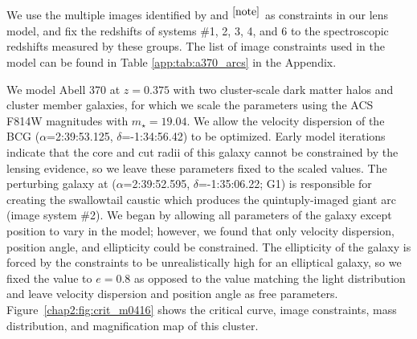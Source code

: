 We use the multiple images identified by \citet{Richard:2010wd} and  \citet{Richard:2014gf}$^{\ref{note}}$ as constraints in our lens model, and fix the redshifts of systems \#1, 2, 3, 4, and 6 to the spectroscopic redshifts measured by these groups. The list of image constraints used in the model can be found in Table \ref{app:tab:a370_arcs} in the Appendix.

We model Abell 370 at $z=0.375$ with two cluster-scale dark matter halos and cluster member galaxies, for which we scale the parameters using the ACS F814W magnitudes with $m_\star=19.04$. We allow the velocity dispersion of the BCG ($\alpha$=2:39:53.125, $\delta$=-1:34:56.42) to be optimized. Early model iterations indicate that the core and cut radii of this galaxy cannot be constrained by the lensing evidence, so we leave these parameters fixed to the scaled values. The perturbing galaxy at ($\alpha$=2:39:52.595, $\delta$=-1:35:06.22; G1) is responsible for creating the swallowtail caustic which produces the quintuply-imaged giant arc (image system \#2). We began by allowing all parameters of the galaxy except position to vary in the model; however, we found that only velocity dispersion, position angle, and ellipticity could be constrained. The ellipticity of the galaxy is forced by the constraints to be unrealistically high for an elliptical galaxy, so we fixed the value to $e=0.8$ as opposed to the value matching the light distribution and leave velocity dispersion and position angle as free parameters. Figure~\ref{chap2:fig:crit_m0416} shows the critical curve, image constraints, mass distribution, and magnification map of this cluster.


